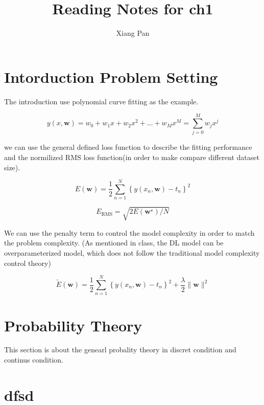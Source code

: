 \documentclass[11pt,en,cite=authoryear]{elegantpaper}
\title{Reading Notes for ch1}
\author{Xiang Pan}
\institute{New York University}
\begin{document}
\setlength{\droptitle}{-10em} 
\section{Intorduction Problem Setting}
The introduction use polynomial curve fitting as the example. 

$$y(x, \mathbf{w})=w_{0}+w_{1} x+w_{2} x^{2}+\ldots+w_{M} x^{M}=\sum_{j=0}^{M} w_{j} x^{j}$$

we can use the general defined loss function to describe the fitting performance and the normilized RMS loss function(in order to make compare different dataset size).

$$E(\mathbf{w})=\frac{1}{2} \sum_{n=1}^{N}\left\{y\left(x_{n}, \mathbf{w}\right)-t_{n}\right\}^{2}$$

$$E_{\mathrm{RMS}}=\sqrt{2 E\left(\mathbf{w}^{\star}\right) / N}$$

We can use the penalty term to control the model complexity in order to match the problem complexity. (As mentioned in class, the DL model can be overparameterized model, which does not follow the traditional model complexity control theory)

$$\widetilde{E}(\mathbf{w})=\frac{1}{2} \sum_{n=1}^{N}\left\{y\left(x_{n}, \mathbf{w}\right)-t_{n}\right\}^{2}+\frac{\lambda}{2}\|\mathbf{w}\|^{2}$$

\section{Probability Theory}
This section is about the genearl probality theory in discret condition and continus condition.

\section{dfsd}




\appendix
\addappheadtotoc
\end{document}

